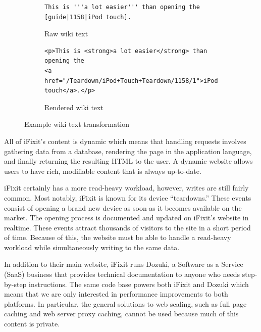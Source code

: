 \documentclass[12pt]{ucthesis}
\begin{document}
\begin{figure}[hbtp]
\begin{subfigure}[b]{1.0\textwidth}
\begin{ssp}
\begin{verbatim}
This is '''a lot easier''' than opening the [guide|1158|iPod touch].
\end{verbatim}
\end{ssp}
\caption{Raw wiki text}
\label{fig:wikiTextTransformationRaw}
\end{subfigure}

\begin{subfigure}[b]{1.0\textwidth}
\begin{ssp}
\begin{verbatim}
<p>This is <strong>a lot easier</strong> than opening the
<a href="/Teardown/iPod+Touch+Teardown/1158/1">iPod touch</a>.</p>
\end{verbatim}
\end{ssp}
\caption{Rendered wiki text}
\label{fig:wikiTextTransformationRendered}
\end{subfigure}

\caption{Example wiki text transformation}
\label{fig:wikiTextTransformation}
\end{figure}

All of \textsf{iFixit}'s content is dynamic which means that handling requests involves gathering data from a database, rendering the page in the application language, and finally returning the resulting HTML to the user.
A dynamic website allows users to have rich, modifiable content that is always up-to-date.

\textsf{iFixit} certainly has a more read-heavy workload, however, writes are still fairly common.
Most notably, \textsf{iFixit} is known for its device ``teardowns.''
These events consist of opening a brand new device as soon as it becomes available on the market.
The opening process is documented and updated on \textsf{iFixit}'s website in realtime.
These events attract thousands of visitors to the site in a short period of time.
Because of this, the website must be able to handle a read-heavy workload while simultaneously writing to the same data.

In addition to their main website, \textsf{iFixit} runs \textsf{Dozuki}, a Software as a Service (SaaS) business that provides technical documentation to anyone who needs step-by-step instructions.
The same code base powers both \textsf{iFixit} and \textsf{Dozuki} which means that we are only interested in performance improvements to both platforms.
In particular, the general solutions to web scaling, such as full page caching and web server proxy caching, cannot be used because much of this content is private.
\end{document}
